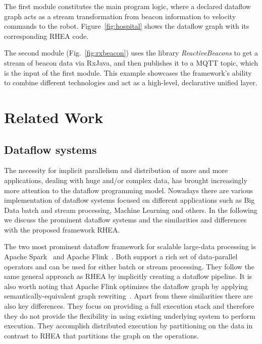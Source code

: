 \documentclass[sigplan,screen,10pt]{acmart}
\begin{document}
The first module constitutes the main program logic, where a declared dataflow
graph acts as a stream transformation from beacon information to velocity
commands to the robot. Figure~\ref{fig:hospital} shows the dataflow graph with
its corresponding \textsc{RHEA} code.


The second module (Fig.~\ref{fig:rxbeacon}) uses the library
\textit{ReactiveBeacons}
to get a stream of beacon data via RxJava, and then publishes it to a MQTT topic,
which is the input of the first module. This example showcases the framework's ability
to combine different technologies and act as a high-level, declarative unified layer.


\section{Related Work} \label{sec:related}

\subsection{Dataflow systems}

The necessity for implicit parallelism and distribution of more and more
applications, dealing with huge and/or complex data, has brought increasingly
more attention to the dataflow programming model. Nowadays there are various
implementation of dataflow systems focused on different applications such as
Big Data batch and stream processing, Machine Learning and others.
In the following we discuss the prominent dataflow systems and the similarities
and differences with the proposed framework \textsc{RHEA}.

The two most prominent dataflow framework for scalable large-data processing
is Apache Spark~\cite{spark} and Apache Flink~\cite{stratosphere}. Both support
a rich set of data-parallel operators and can be used for either batch or
stream processing. They follow the same general approach as \textsc{RHEA} by
implicitly creating a dataflow pipeline. It is also worth noting that Apache Flink
optimizes the dataflow graph by applying semantically-equivalent graph rewriting~\cite{blackbox}.
Apart from these similarities there are also key differences.
They focus on providing a full execution stack and therefore they do not
provide the flexibility in using
existing  underlying system to perform execution. They accomplish distributed
execution by partitioning on the data in contrast to \textsc{RHEA} that partitions
the graph on the operations.
\end{document}
